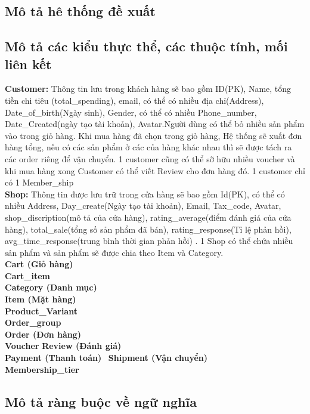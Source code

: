 \fontsize{11.5pt}{13pt}\selectfont
\setlength{\leftmargini}{50pt}
\subsection{Mô tả hê thống đề xuất}
\subsection{Mô tả các kiểu thực thể, các thuộc tính, mối liên kết}
\textbf{Customer:} Thông tin lưu trong khách hàng sẽ bao gồm ID(PK), Name, tổng tiền chi tiêu (total\_spending), email, 
có thể có nhiều địa chỉ(Address), Date\_of\_birth(Ngày sinh), 
Gender, có thể có nhiều Phone\_number, Date\_Created(ngày tạo tài khoản), 
Avatar.Người dùng có thể bỏ nhiều sản phẩm vào trong giỏ hàng. 
Khi mua hàng đã chọn trong giỏ hàng, Hệ thống sẽ xuất đơn hàng tổng, 
nếu có các sản phẩm ở các của hàng khác nhau thì sẽ được tách ra các order riêng để vận chuyển. 
1 customer cũng có thể sỡ hữu nhiều voucher và khi mua hàng xong Customer có thể viết 
Review cho đơn hàng đó. 1 customer chỉ có 1 Member\_ship \\
\textbf{Shop:} Thông tin được lưu trữ trong cửa hàng sẽ bao gồm Id(PK), có thể có nhiều Address, 
Day\_create(Ngày tạo tài khoản), Email, Tax\_code, Avatar, shop\_discription(mô tả của cửa hàng), 
rating\_average(điểm đánh giá của cửa hàng), total\_sale(tổng số sản phẩm đã bán), rating\_response(Tỉ lệ phản hồi), 
avg\_time\_response(trung bình thời gian phản hồi) .
1 Shop có thể chứa nhiều sản phẩm và sản phẩm sẽ được chia theo Item và Category.\\ 
\textbf{Cart (Giỏ hàng)} \\
\textbf{Cart\_item} \\
\textbf{Category (Danh mục)} \\
\textbf{Item (Mặt hàng)} \\
\textbf{Product\_Variant} \\
\textbf{Order\_group} \\
\textbf{Order (Đơn hàng)} \\
\textbf{Voucher}
\textbf{Review (Đánh giá)} \\
\textbf{Payment (Thanh toán)} \
\textbf{Shipment (Vận chuyển)} \\
\textbf{Membership\_tier} \\


\subsection{Mô tả ràng buộc về ngữ nghĩa}